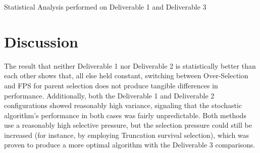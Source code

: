 \documentclass[11pt]{article}
\newcommand{\tablecaption}[1]{\caption{Statistical Analysis performed on {#1}}}
\begin{document}
\begin{table}[H] 
\tablecaption{Deliverable 1 and Deliverable 3}        
\label{d1_d3}                 
\end{table}

\section{Discussion}
The result that neither Deliverable 1 nor Deliverable 2 is statistically better than each other shows that, 
all else held constant, switching between Over-Selection and
FPS for parent selection does not produce tangible differences in 
performance. Additionally, both the Deliverable 1 and Deliverable 2 configurations showed reasonably high variance, 
signaling that the stochastic algorithm's performance in both cases was fairly unpredictable. 
Both methods use a reasonably high selective pressure,
but the selection pressure could still be increased (for instance, by employing Truncation survival selection), which was 
proven to produce a more optimal algorithm with the Deliverable 3 comparisons.
\end{document}
